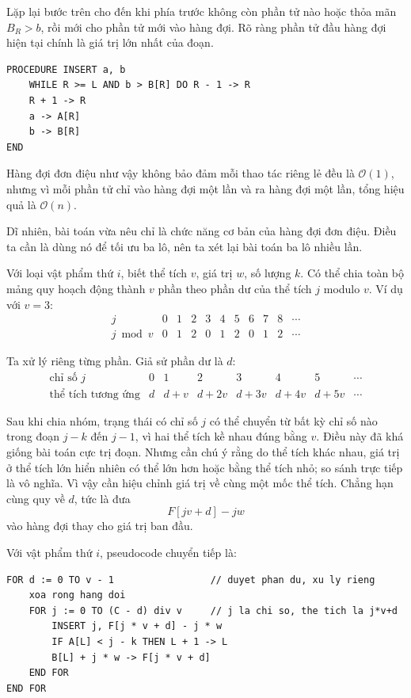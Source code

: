 \documentclass[11pt]{article}
\newcommand{\Oh}{\mathcal{O}}
\begin{document}
Lặp lại bước trên cho đến khi phía trước không còn phần tử nào hoặc thỏa mãn
\(B_R>b\), rồi mới cho phần tử mới vào hàng đợi. Rõ ràng phần tử đầu hàng đợi
hiện tại chính là giá trị lớn nhất của đoạn.

\begin{verbatim}
PROCEDURE INSERT a, b
    WHILE R >= L AND b > B[R] DO R - 1 -> R
    R + 1 -> R
    a -> A[R]
    b -> B[R]
END
\end{verbatim}

Hàng đợi đơn điệu như vậy không bảo đảm mỗi thao tác riêng lẻ đều là \(\Oh(1)\),
nhưng vì mỗi phần tử chỉ vào hàng đợi một lần và ra hàng đợi một lần, tổng
hiệu quả là \(\Oh(n)\).

Dĩ nhiên, bài toán vừa nêu chỉ là chức năng cơ bản của hàng đợi đơn điệu. Điều
ta cần là dùng nó để tối ưu ba lô, nên ta xét lại bài toán ba lô nhiều lần.

Với loại vật phẩm thứ \(i\), biết thể tích \(v\), giá trị \(w\), số lượng
\(k\). Có thể chia toàn bộ mảng quy hoạch động thành \(v\) phần theo phần dư
của thể tích \(j\) modulo \(v\). Ví dụ với \(v=3\):
\[
\begin{array}{c|cccccccccc}
j & 0&1&2&3&4&5&6&7&8&\cdots\\
\hline
j\bmod v & 0&1&2&0&1&2&0&1&2&\cdots
\end{array}
\]

Ta xử lý riêng từng phần. Giả sử phần dư là \(d\):
\[
\begin{array}{c|ccccccc}
\text{chỉ số }j & 0&1&2&3&4&5&\cdots\\
\hline
\text{thể tích tương ứng}
& d&d+v&d+2v&d+3v&d+4v&d+5v&\cdots
\end{array}
\]

Sau khi chia nhóm, trạng thái có chỉ số \(j\) có thể chuyển từ bất kỳ chỉ số
nào trong đoạn \(j-k\) đến \(j-1\), vì hai thể tích kề nhau đúng bằng \(v\).
Điều này đã khá giống bài toán cực trị đoạn. Nhưng cần chú ý rằng do thể tích
khác nhau, giá trị ở thể tích lớn hiển nhiên có thể lớn hơn hoặc bằng thể tích
nhỏ; so sánh trực tiếp là vô nghĩa. Vì vậy cần hiệu chỉnh giá trị về cùng một
mốc thể tích. Chẳng hạn cùng quy về \(d\), tức là đưa
\[
  F[jv+d]-j w
\]
vào hàng đợi thay cho giá trị ban đầu.

Với vật phẩm thứ \(i\), pseudocode chuyển tiếp là:

\begin{verbatim}
FOR d := 0 TO v - 1                 // duyet phan du, xu ly rieng
    xoa rong hang doi
    FOR j := 0 TO (C - d) div v     // j la chi so, the tich la j*v+d
        INSERT j, F[j * v + d] - j * w
        IF A[L] < j - k THEN L + 1 -> L
        B[L] + j * w -> F[j * v + d]
    END FOR
END FOR
\end{verbatim}
\end{document}

